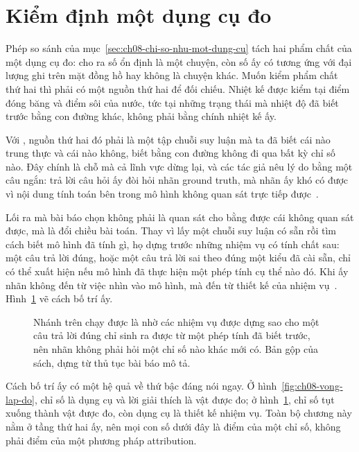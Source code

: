 \section{Kiểm định một dụng cụ đo}
\label{sec:ch09-kiem-dinh-mot-dung-cu-do}

%
%
Phép so sánh của mục~\ref{sec:ch08-chi-so-nhu-mot-dung-cu} tách hai phẩm chất
của một dụng cụ đo: cho ra số ổn định là một chuyện, còn số ấy có tương ứng
với đại lượng ghi trên mặt đồng hồ hay không là chuyện khác. Muốn kiểm phẩm
chất thứ hai thì phải có một nguồn thứ hai để đối chiếu. Nhiệt kế được kiểm
tại điểm đóng băng và điểm sôi của nước, tức tại những trạng thái mà nhiệt độ
đã biết trước bằng con đường khác, không phải bằng chính nhiệt kế ấy.

Với , nguồn thứ hai đó phải là một
tập chuỗi suy luận mà ta
đã biết cái nào trung thực và cái nào không, biết bằng con đường không đi qua
bất kỳ chỉ số nào. Đây chính là chỗ mà cả lĩnh vực dừng lại, và các tác giả
nêu lý do bằng một câu ngắn: trả lời câu hỏi ấy đòi hỏi nhãn ground truth, mà
nhãn ấy khó có được vì nội dung tính toán bên trong mô hình không quan sát
trực tiếp được~\autocite{p21metrics}.

Lối ra mà bài báo chọn không phải là quan sát cho bằng được cái không quan sát
được, mà là đổi chiều bài toán. Thay vì lấy một chuỗi suy luận có sẵn rồi tìm
cách biết mô hình đã tính gì, họ dựng trước những nhiệm vụ có tính chất sau:
một câu trả lời đúng, hoặc một câu trả lời sai theo đúng một kiểu đã cài sẵn,
chỉ có thể xuất hiện nếu mô hình đã thực hiện một phép tính cụ thể nào đó. Khi
ấy nhãn không đến từ việc nhìn vào mô hình, mà đến từ thiết kế của nhiệm
vụ~\autocite{p21metrics}. Hình~\ref{fig:ch09-vong-kiem-dinh} vẽ cách bố trí ấy.

\begin{figure}[htbp]
  \centering
  
  \caption{Nhánh trên chạy được là nhờ các nhiệm vụ được dựng sao cho một câu
  trả lời đúng chỉ sinh ra được từ một phép tính đã biết trước, nên nhãn không
  phải hỏi một chỉ số nào khác mới có. Bản gộp của sách, dựng từ thủ tục bài
  báo mô tả.}
  \label{fig:ch09-vong-kiem-dinh}
\end{figure}

Cách bố trí ấy có một hệ quả về thứ bậc đáng nói ngay. Ở
hình~\ref{fig:ch08-vong-lap-do}, chỉ số là dụng cụ và lời giải thích là vật
được đo; ở hình~\ref{fig:ch09-vong-kiem-dinh}, chỉ số tụt xuống thành vật được
đo, còn dụng cụ là thiết kế nhiệm vụ. Toàn bộ chương này nằm ở tầng thứ hai
ấy, nên mọi con số dưới đây là điểm của một chỉ số, không phải điểm của một
phương pháp attribution.


